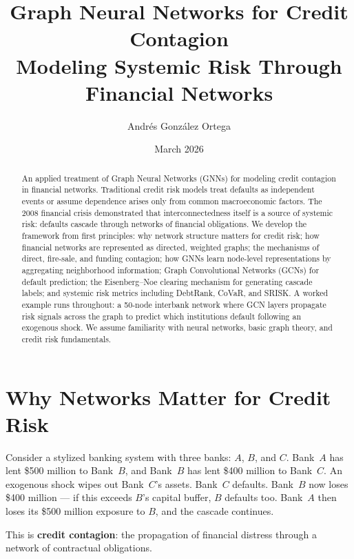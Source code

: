\documentclass[11pt, a4paper]{article}
\title{%
    \textbf{Graph Neural Networks for Credit Contagion} \\[0.5em]
    \large Modeling Systemic Risk Through Financial Networks
}
\author{Andr\'es Gonz\'alez Ortega}
\date{March 2026}
\theoremstyle{definition}
\theoremstyle{plain}
\theoremstyle{remark}
\begin{document}
\maketitle

\begin{abstract}
An applied treatment of Graph Neural Networks (GNNs) for modeling credit contagion
in financial networks.
Traditional credit risk models treat defaults as independent events or assume
dependence arises only from common macroeconomic factors.
The 2008 financial crisis demonstrated that interconnectedness itself is a source
of systemic risk: defaults cascade through networks of financial obligations.
We develop the framework from first principles: why network structure matters for
credit risk; how financial networks are represented as directed, weighted graphs;
the mechanisms of direct, fire-sale, and funding contagion; how GNNs learn
node-level representations by aggregating neighborhood information; Graph Convolutional
Networks (GCNs) for default prediction; the Eisenberg--Noe clearing mechanism for
generating cascade labels; and systemic risk metrics including DebtRank, CoVaR,
and SRISK\@.
A worked example runs throughout: a 50-node interbank network where GCN layers
propagate risk signals across the graph to predict which institutions default
following an exogenous shock.
We assume familiarity with neural networks, basic graph theory, and credit risk
fundamentals.
\end{abstract}

\tableofcontents
\newpage

\section{Why Networks Matter for Credit Risk}
\label{sec:why-networks}

Consider a stylized banking system with three banks: $A$, $B$, and $C$.
Bank~$A$ has lent \$500 million to Bank~$B$, and Bank~$B$ has lent \$400 million
to Bank~$C$.
An exogenous shock wipes out Bank~$C$'s assets.
Bank~$C$ defaults.
Bank~$B$ now loses \$400 million --- if this exceeds $B$'s capital buffer, $B$
defaults too.
Bank~$A$ then loses its \$500 million exposure to $B$, and the cascade continues.

This is \textbf{credit contagion}: the propagation of financial distress through a
network of contractual obligations.
\end{document}
